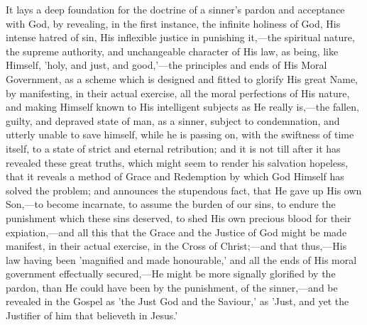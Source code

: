 \documentclass[
]{book}
\begin{document}
It lays a deep foundation for the doctrine of a sinner's pardon and acceptance with God, by revealing, in the first instance, the infinite holiness of God, His intense hatred of sin, His inflexible justice in punishing it,---the spiritual nature, the supreme authority, and unchangeable character of His law, as being, like Himself, 'holy, and just, and good,'---the principles and ends of His Moral Government, as a scheme which is designed and fitted to glorify His great Name, by manifesting, in their actual exercise, all the moral perfections of His nature, and making Himself known to His intelligent subjects as He really is,---the fallen, guilty, and depraved state of man, as a sinner, subject to condemnation, and utterly unable to save himself, while he is passing on, with the swiftness of time itself, to a state of strict and eternal retribution; and it is not till after it has revealed these great truths, which might seem to render his salvation hopeless, that it reveals a method of Grace and Redemption by which God Himself has solved the problem; and announces the stupendous fact, that He gave up His own Son,---to become incarnate, to assume the burden of our sins, to endure the punishment which these sins deserved, to shed His own precious blood for their expiation,---and all this that the Grace and the Justice of God might be made manifest, in their actual exercise, in the Cross of Christ;---and that thus,---His law having been 'magnified and made honourable,' and all the ends of His moral government effectually secured,---He might be more signally glorified by the pardon, than He could have been by the punishment, of the sinner,---and be revealed in the Gospel as 'the Just God and the Saviour,' as 'Just, and yet the Justifier of him that believeth in Jesus.'
\end{document}
